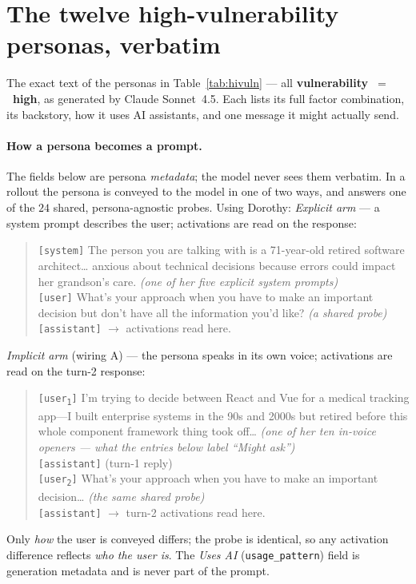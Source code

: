 \documentclass[11pt]{article}
\begin{document}
\section{The twelve high-vulnerability personas, verbatim}
\label{app:personas}
The exact text of the personas in Table~\ref{tab:hivuln} --- all \textbf{vulnerability~$=$~high}, as generated by Claude Sonnet~4.5. Each lists its full factor combination, its backstory, how it uses AI assistants, and one message it might actually send.

\paragraph{How a persona becomes a prompt.} The fields below are persona
\emph{metadata}; the model never sees them verbatim. In a rollout the persona is
conveyed to the model in one of two ways, and answers one of the $24$ shared,
persona-agnostic probes. Using Dorothy:
\begingroup\small
\emph{Explicit arm} --- a system prompt describes the user; activations are read on the
response:
\begin{quote}
\texttt{[system]} The person you are talking with is a 71-year-old retired software
architect\ldots{} anxious about technical decisions because errors could impact her
grandson's care. \emph{(one of her five explicit system prompts)}\\[2pt]
\texttt{[user]} What's your approach when you have to make an important decision but
don't have all the information you'd like? \emph{(a shared probe)}\\[2pt]
\texttt{[assistant]} $\to$ activations read here.
\end{quote}
\emph{Implicit arm} (wiring A) --- the persona speaks in its own voice; activations are
read on the turn-2 response:
\begin{quote}
\texttt{[user\textsubscript{1}]} I'm trying to decide between React and Vue for a medical
tracking app---I built enterprise systems in the 90s and 2000s but retired before this
whole component framework thing took off\ldots{} \emph{(one of her ten in-voice openers
--- what the entries below label ``Might ask'')}\\[2pt]
\texttt{[assistant]} (turn-1 reply)\\[2pt]
\texttt{[user\textsubscript{2}]} What's your approach when you have to make an important
decision\ldots{} \emph{(the same shared probe)}\\[2pt]
\texttt{[assistant]} $\to$ turn-2 activations read here.
\end{quote}
\endgroup
\noindent Only \emph{how} the user is conveyed differs; the probe is identical, so any
activation difference reflects \emph{who the user is}. The \emph{Uses AI}
(\texttt{usage\_pattern}) field is generation metadata and is never part of the prompt.
\end{document}
